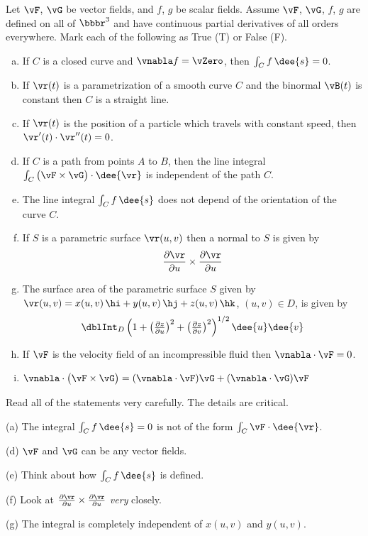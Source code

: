 \begin{question}[M317 2006A] %
Let $\vF$, $\vG$ be vector fields, and $f$, $g$ be scalar fields.
Assume $\vF$, $\vG$, $f$, $g$ are defined on all of $\bbbr^3$ and
have continuous partial derivatives of all orders everywhere.
Mark each of the following as True (T) or False (F).

\begin{enumerate}[(a)]
\item
If $C$ is a closed curve and $\vnabla f=\vZero$, then $\int_C f\,\dee{s}=0$.
\item
If $\vr(t)$ is a parametrization of a smooth curve $C$ and the binormal
$\vB(t)$  is constant then $C$ is a straight line.
\item
If $\vr(t)$ is the position of a particle which travels with constant speed,
then $\vr'(t)\cdot\vr''(t)=0$. 
\item
If $C$ is a path from points $A$ to $B$, then the line integral $\int_C\big(\vF\times\vG\big)\cdot\dee{\vr}$ is independent of 
the path $C$.
\item
The line integral $\int_C f\,\dee{s}$ does not depend of the orientation of
the curve $C$.
\item
If $S$ is a parametric surface $\vr(u,v)$ then a normal to $S$ is given
by
\begin{align*}
\frac{\partial\vr}{\partial u}\times \frac{\partial\vr}{\partial u}
\end{align*}
\item
The surface area of the parametric surface $S$ given by 
$\vr(u,v) = x(u,v)\,\hi + y(u,v)\,\hj + z(u,v)\,\hk$, $(u,v)\in D$, is
given by
\begin{align*}
\dblInt_D \left(1+\big(\tfrac{\partial z}{\partial u}\big)^2
             +\big(\tfrac{\partial z}{\partial v}\big)^2\right)^{1/2}                  \dee{u}\dee{v}
\end{align*}
\item
If $\vF$ is the velocity field of an incompressible fluid then 
$\vnabla\cdot\vF=0$.
\item
$\vnabla\cdot\big(\vF\times\vG\big) 
= (\vnabla\cdot\vF)\vG + (\vnabla\cdot\vG)\vF$
\end{enumerate}
\end{question}

\begin{hint} 
Read all of the statements very carefully. The details are critical.

(a) The integral $\int_C f\,\dee{s}=0$ is not of the form 
     $\int_C \vF \cdot \dee{\vr}$.

(d) $\vF$ and $\vG$ can be any vector fields.

(e) Think about how $\int_C f\,\dee{s}$ is defined.

(f) Look at $\frac{\partial\vr}{\partial u}\times 
          \frac{\partial\vr}{\partial u}$ \emph{very} closely.

(g) The integral is completely independent of $x(u,v)$ and $y(u,v)$.

\end{hint}

